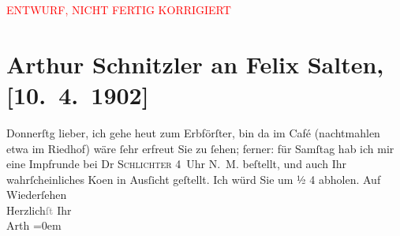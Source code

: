 
\begin{center}
            \textcolor{red}{ENTWURF, NICHT FERTIG KORRIGIERT}
                      \end{center}
            
         
         \renewcommand{\erwaehntePersonen}{Personen: Felix Salten, Felix Schlichter}
         \renewcommand{\erwaehnteOrte}{Orte: Riedhof, Wien}
         \renewcommand{\erwaehnteWerke}{Werke: Der Erbförster}
               \section[Arthur Schnitzler an Felix Salten, {[}10. 4. 1902{]}]{ Arthur Schnitzler an Felix Salten, {[}10. 4. 1902{]}}\nopagebreak{}\rehead{ }\begin{ledgroupsized}[t]{13cm}\normalsize\beginnumbering \toendnotes[C]{\smallbreak\pagebreak[2]} 
\pstart
           \raggedleft{}{\pb}Donnerſtg\pend
           \pstart
           lieber, ich gehe heut zum Erbförſter, bin da{\geminationn} im Café (nachtmahlen etwa
               im Riedhof) wäre ſehr erfreut Sie zu ſehen;
               ferner: für Samſtag hab ich mir eine Impfrunde {\pb}bei Dr \textsc{Schlichter}{ }4 Uhr N. M. beſtellt, und auch Ihr wahrſcheinliches Ko{\geminationm}en in Ausſicht geſtellt. Ich würd Sie um ½ 4 abholen. \pend
           \pstart
           Auf Wiederſehen {\\[\baselineskip]}Herzlich\textcolor{gray}{ſt} Ihr {\\[\baselineskip]}\spacefill\mbox{Arth}\pend
           \leftskip=0em{}
         
         \endnumbering{}\end{ledgroupsized}\begin{anhang}\end{anhang}\newcommand{\dateiname}{L02973}\newcommand{\titel}{Arthur Schnitzler an Felix Salten, [10. 4. 1902]}\newcommand{\editorInnen}{Martin Anton Müller und Laura Untner}
      